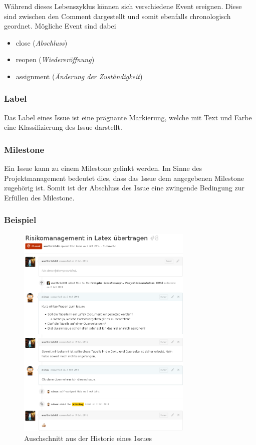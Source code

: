 Während dieses Lebenszyklus können sich verschiedene \gls{Event} ereignen.
Diese sind zwischen den \gls{Comment} dargestellt und somit ebenfalls
chronologisch geordnet. Mögliche \gls{Event} sind dabei

\begin{itemize}
	\item close (\emph{Abschluss})
	\item reopen (\emph{Wiedereröffnung})
	\item assignment (\emph{Änderung der Zuständigkeit})
\end{itemize}

\subsubsection{Label}
Das \gls{Label} eines \gls{Issue} ist eine prägnante Markierung, welche mit
Text und Farbe eine Klassifizierung des \gls{Issue} darstellt. 

\subsubsection{Milestone}
Ein \gls{Issue} kann zu einem \gls{Milestone} gelinkt werden. Im Sinne des
Projektmanagement bedeutet dies, dass das \gls{Issue} dem angegebenen
\gls{Milestone} zugehörig ist. Somit ist der Abschluss des \gls{Issue}
eine zwingende Bedingung zur Erfüllen des \gls{Milestone}.

\subsubsection{Beispiel}

\begin{figure}[h!]
	\centering
	\includegraphics[width=0.75\textwidth]{../../fig/github/issue_comment.png}
	\caption{Auschschnitt aus der Historie eines Issues}
\end{figure}
